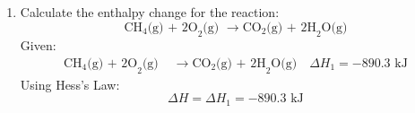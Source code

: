 \documentclass{article}
\begin{document}
\begin{enumerate}
    \item Calculate the enthalpy change for the reaction:
    \[
    \text{CH}_4\text{(g) + 2O}_2\text{(g) } \rightarrow \text{CO}_2\text{(g) + 2H}_2\text{O(g)}
    \]
    Given:
    \begin{align*}
    \text{CH}_4\text{(g) + 2O}_2\text{(g) } &\rightarrow \text{CO}_2\text{(g) + 2H}_2\text{O(g)} \quad \Delta H_1 = -890.3 \text{ kJ}
    \end{align*}
    Using Hess's Law:
    \[
    \Delta H = \Delta H_1 = -890.3 \text{ kJ}
    \]
\end{enumerate}
\end{document}
